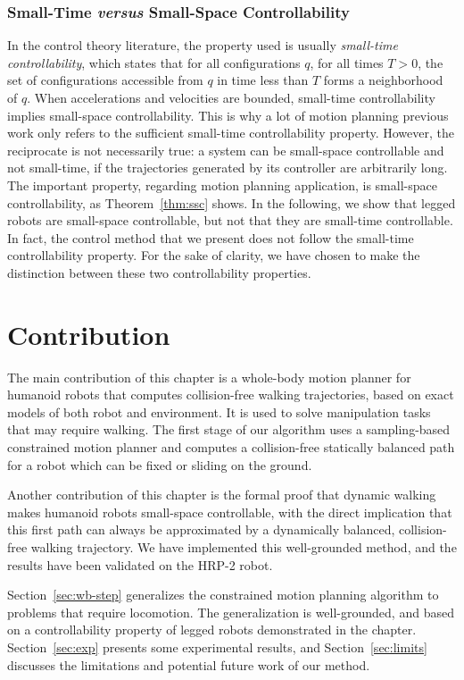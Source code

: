 \subsubsection{Small-Time \textit{versus} Small-Space Controllability}
In the control theory literature, the property used is usually
\textit{small-time controllability}, which states that for all
configurations $q$, for all times $T>0$, the set of configurations
accessible from $q$ in time less than $T$ forms a neighborhood of
$q$. When accelerations and velocities are bounded, small-time
controllability implies small-space controllability. This is why a lot
of motion planning previous work only refers to the sufficient
small-time controllability property. However, the reciprocate is not
necessarily true: a system can be small-space controllable and not
small-time, if the trajectories generated by its controller are
arbitrarily long.  The important property, regarding motion planning
application, is small-space controllability, as Theorem~\ref{thm:ssc}
shows. In the following, we show that legged robots are small-space
controllable, but not that they are small-time controllable.  In fact,
the control method that we present does not follow the small-time
controllability property. For the sake of clarity, we have chosen to
make the distinction between these two controllability properties.

\section{Contribution}
\label{chap2-contribution}

The main contribution of this chapter is a whole-body motion planner
for humanoid robots that computes collision-free walking trajectories,
based on exact models of both robot and environment. It is used to
solve manipulation tasks that may require walking. The first stage of
our algorithm uses a sampling-based constrained motion planner and
computes a collision-free statically balanced path for a robot which
can be fixed or sliding on the ground.

Another contribution of this chapter is the formal proof that dynamic
walking makes humanoid robots small-space controllable, with the
direct implication that this first path can always be approximated by
a dynamically balanced, collision-free walking trajectory. We have
implemented this well-grounded method, and the results have been
validated on the HRP-2 robot.

Section~\ref{sec:wb-step} generalizes the constrained motion planning
algorithm to problems that require locomotion. The generalization is
well-grounded, and based on a controllability property of legged
robots demonstrated in the chapter. Section~\ref{sec:exp} presents
some experimental results, and Section~\ref{sec:limits} discusses the
limitations and potential future work of our method.

